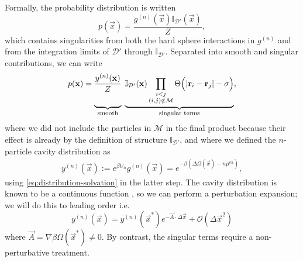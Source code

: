 \documentclass[11pt,twoside]{report}
\begin{document}
Formally, the probability distribution is written
\begin{equation}
  p(\vec{x})
  =
  \frac{g^{(n)}(\vec{x}) \mathbb{I}_{\mathcal{D}'}(\vec{x})}{Z},
\end{equation}
which contains singularities from both the hard sphere interactions in $g^{(n)}$ and from the integration limits of $\mathcal{D}'$ through $\mathbb{I}_{\mathcal{D}'}$.
Separated into smooth and singular contributions, we can write
\begin{equation*}
  p(\vec{x})
  =
  \underbrace{
    \frac{y^{(n)}(\vec{x})}{Z}
    \vphantom{\prod_{\substack{i < j \\ (i,j) \notin \mathcal{M}}}}
  }_\textrm{smooth}
  \;
  \underbrace{
    \mathbb{I}_{\mathcal{D}'}(\vec{x})
    \prod_{\substack{i < j \\ (i,j) \notin \mathcal{M}}}
    \Theta \Big( |\vec{r}_i - \vec{r}_j| - \sigma \Big)
  }_\textrm{singular terms},
\end{equation*}
where we did not include the particles in $\mathcal{M}$ in the final product because their effect is already by the definition of structure $\mathbb{I}_{\mathcal{D}'}$, and where we defined the $n$-particle cavity distribution as
\begin{equation*}
  \begin{split}
    y^{(n)}(\vec{x})
    :=
    e^{\beta U_n} g^{(n)}(\vec{x}) = e^{-\beta(\Delta\Omega(\vec{x}) - n\mu^\mathrm{ex})},
  \end{split}
\end{equation*}
using \eqref{eq:distribution-solvation} in the latter step.
The cavity distribution is known to be a continuous function \cite{Hansen2013}, so we can perform a perturbation expansion; we will do this to leading order i.e.\
\begin{equation}\label{eq:cavity-perturbation}
  y^{(n)}(\vec{x})
  =
  y^{(n)}(\vec{x}^*) e^{-\vec{A} \cdot \Delta \vec{x}}
  + \mathcal{O}(\Delta \vec{x}^2)
\end{equation}
where $\vec{A} = \nabla \beta\Omega(\vec{x}^*) \ne 0$.
By contrast, the singular terms require a non-perturbative treatment.
\end{document}
